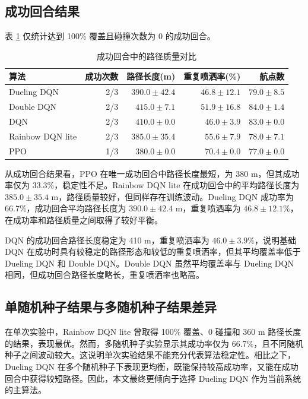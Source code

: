\documentclass[UTF8]{ctexart}
\begin{document}
\subsection{成功回合结果}

表 \ref{tab:successonly} 仅统计达到 100\% 覆盖且碰撞次数为 0 的成功回合。

\begin{table}[H]
\centering
\caption{成功回合中的路径质量对比}
\label{tab:successonly}
\begin{tabular}{lrrrr}
\toprule
算法 & 成功次数 & 路径长度(m) & 重复喷洒率(\%) & 航点数 \\
\midrule
Dueling DQN & 2/3 & $390.0 \pm 42.4$ & $46.8 \pm 12.1$ & $79.0 \pm 8.5$ \\
Double DQN & 2/3 & $415.0 \pm 7.1$ & $51.9 \pm 16.8$ & $84.0 \pm 1.4$ \\
DQN & 2/3 & $410.0 \pm 0.0$ & $46.0 \pm 3.9$ & $83.0 \pm 0.0$ \\
Rainbow DQN lite & 2/3 & $385.0 \pm 35.4$ & $55.6 \pm 7.9$ & $78.0 \pm 7.1$ \\
PPO & 1/3 & $380.0 \pm 0.0$ & $70.4 \pm 0.0$ & $77.0 \pm 0.0$ \\
\bottomrule
\end{tabular}
\end{table}

从成功回合结果看，PPO 在唯一成功回合中路径长度最短，为 380 m，但其成功率仅为 33.3\%，稳定性不足。Rainbow DQN lite 在成功回合中的平均路径长度为 $385.0\pm35.4$ m，路径质量较好，但同样存在训练波动。Dueling DQN 成功率为 66.7\%，成功回合平均路径长度为 $390.0\pm42.4$ m，重复喷洒率为 $46.8\pm12.1\%$，在成功率和路径质量之间取得了较好平衡。

DQN 的成功回合路径长度稳定为 410 m，重复喷洒率为 $46.0\pm3.9\%$，说明基础 DQN 在成功时具有较稳定的路径形态和较低的重复喷洒率，但其平均覆盖率低于 Dueling DQN 和 Double DQN。Double DQN 虽然平均覆盖率与 Dueling DQN 相同，但成功回合路径长度略长，重复喷洒率也略高。

\subsection{单随机种子结果与多随机种子结果差异}

在单次实验中，Rainbow DQN lite 曾取得 100\% 覆盖、0 碰撞和 360 m 路径长度的结果，表现最优。然而，多随机种子实验显示其成功率仅为 66.7\%，且不同随机种子之间波动较大。这说明单次实验结果不能充分代表算法稳定性。相比之下，Dueling DQN 在多个随机种子下表现更均衡，既能保持较高成功率，又能在成功回合中获得较短路径。因此，本文最终更倾向于选择 Dueling DQN 作为当前系统的主算法。
\end{document}
